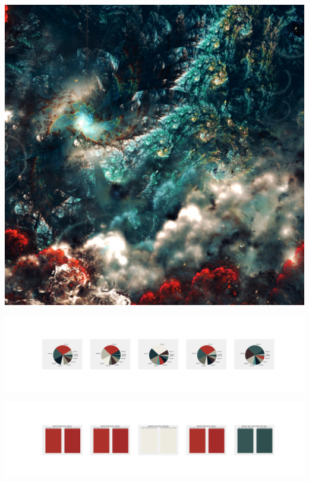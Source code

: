 \documentclass[11pt]{article}
\begin{document}
\begin{landscape}
    \begin{center}
    \includegraphics[width=\textwidth]{./nbimg/file (322).jpg}
    \end{center}

    \begin{center}
    \includegraphics[width=250mm]{./nbimg/pie-248.jpg}
    \end{center}

    \begin{center}
    \includegraphics[width=250mm]{./nbimg/peak-248.jpg}
    \end{center}
    


\end{landscape}
\end{document}
